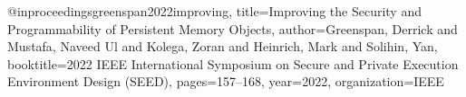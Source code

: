 @inproceedings{greenspan2022improving,
  title={Improving the Security and Programmability of Persistent Memory Objects},
  author={Greenspan, Derrick and Mustafa, Naveed Ul and Kolega, Zoran and Heinrich, Mark and Solihin, Yan},
  booktitle={2022 IEEE International Symposium on Secure and Private Execution Environment Design (SEED)},
  pages={157--168},
  year={2022},
  organization={IEEE}
}
